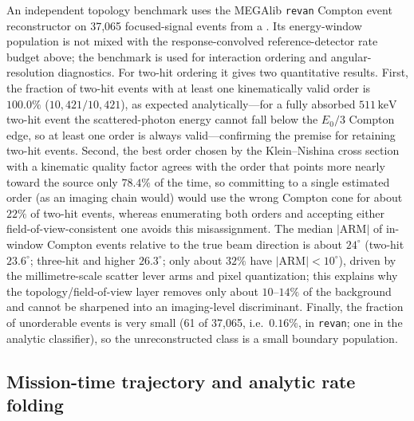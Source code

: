 \documentclass[11pt]{article}
\newcommand{\keV}{\ensuremath{\,\mathrm{keV}}}
\begin{document}
An independent topology benchmark uses the MEGAlib \texttt{revan} Compton event
reconstructor on 37,065 focused-signal events from a 
\cite{Zoglauer2006}. Its energy-window population is not mixed with the
response-convolved reference-detector rate budget above; the benchmark is used
for interaction ordering and angular-resolution diagnostics. For two-hit
ordering it gives two quantitative results. First, the fraction of two-hit
events with at least one kinematically valid order is $100.0\%$
($10{,}421/10{,}421$), as expected analytically---for a fully absorbed
$511\keV$ two-hit event the scattered-photon energy cannot fall below the
$E_0/3$ Compton edge, so at least one order is always valid---confirming the
premise for retaining two-hit events. Second, the best order chosen by the
Klein--Nishina cross section with a kinematic quality factor agrees with the
order that points more nearly toward the source only $78.4\%$ of the time, so
committing to a single estimated order (as an imaging chain would) would use the
wrong Compton cone for about $22\%$ of two-hit events, whereas enumerating both
orders and accepting either field-of-view-consistent one avoids this
misassignment. The median $|\mathrm{ARM}|$ of in-window Compton events relative
to the true beam direction is about $24^\circ$ (two-hit $23.6^\circ$; three-hit
and higher $26.3^\circ$; only about $32\%$ have $|\mathrm{ARM}|<10^\circ$),
driven by the millimetre-scale scatter lever arms and pixel quantization; this
explains why the topology/field-of-view layer removes only about $10$--$14\%$ of
the background and cannot be sharpened into an imaging-level discriminant.
Finally, the fraction of unorderable events is very small (61 of 37,065, i.e.\
$0.16\%$, in \texttt{revan}; one in the analytic classifier), so the
unreconstructed class is a small boundary population.

\subsection{Mission-time trajectory and analytic rate folding}
\label{sec:mission_time_fold}
\end{document}
